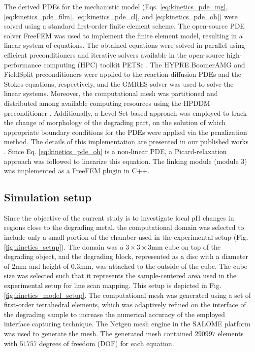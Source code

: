 The derived \gls{PDE}s for the mechanistic model (Eqs. \ref{eq:kinetics_pde_mg}, \ref{eq:kinetics_pde_film}, \ref{eq:kinetics_pde_cl}, and \ref{eq:kinetics_pde_oh}) were solved using a standard first-order finite element scheme. The open-source \gls{PDE} solver FreeFEM \cite{Hecht2012} was used to implement the finite element model, resulting in a linear system of equations. The obtained equations were solved in parallel using efficient preconditioners and iterative solvers available in the open-source high-performance computing (\gls{HPC}) toolkit \gls{PETSc} \cite{petsc}. The HYPRE BoomerAMG \cite{Falgout2002} and FieldSplit preconditioners were applied to the reaction-diffusion \gls{PDE}s and the Stokes equations, respectively, and the \gls{GMRES} solver \cite{Saad1986} was used to solve the linear systems. Moreover, the computational mesh was partitioned and distributed among available computing resources using the \gls{HPDDM} preconditioner \cite{Jolivet2013}. Additionally, a Level-Set-based approach was employed to track the change of morphology of the degrading part, on the solution of which appropriate boundary conditions for the \gls{PDE}s were applied via the penalization method. The details of this implementation are presented in our published works \cite{Barzegari2021, Barzegari2022}. Since Eq. \ref{eq:kinetics_pde_oh} is a non-linear \gls{PDE}, a Picard-relaxation approach was followed to linearize this equation. The linking module (module 3) was implemented as a FreeFEM plugin in C++.

\subsection{Simulation setup}

Since the objective of the current study is to investigate local pH changes in regions close to the degrading metal, the computational domain was selected to include only a small portion of the chamber used in the experimental setup (Fig. \ref{fig:kinetics_setup}). The domain was a $3\times3\times3\text{mm}$ cube on top of the degrading object, and the degrading block, represented as a disc with a diameter of $2 \text{mm}$ and height of $0.3 \text{mm}$, was attached to the outside of the cube. The cube size was selected such that it represents the sample-centered area used in the experimental setup for line scan mapping. This setup is depicted in Fig. \ref{fig:kinetics_model_setup}. The computational mesh was generated using a set of first-order tetrahedral elements, which was adaptively refined on the interface of the degrading sample to increase the numerical accuracy of the employed interface capturing technique. The Netgen mesh engine \cite{Schoeberl1997} in the SALOME platform \cite{Ribes2007} was used to generate the mesh. The generated mesh contained $\num{290997}$ elements with $\num{51757}$ degrees of freedom (\gls{DOF}) for each equation.


